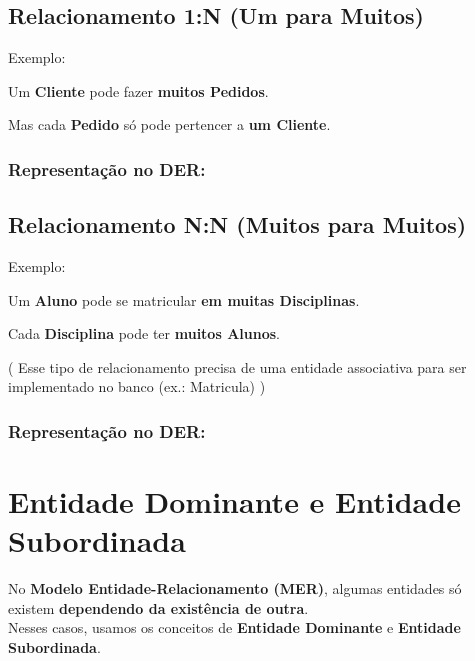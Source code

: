 \documentclass[
]{book}
\begin{document}


\subsection{\texorpdfstring{Relacionamento \textbf{1:N (Um para Muitos)}}{Relacionamento 1:N (Um para Muitos)}}\label{relacionamento-1n-um-para-muitos}

Exemplo:

Um \textbf{Cliente} pode fazer \textbf{muitos Pedidos}.

Mas cada \textbf{Pedido} só pode pertencer a \textbf{um Cliente}.

\subsubsection{Representação no DER:}\label{representauxe7uxe3o-no-der-1}



\subsection{Relacionamento N:N (Muitos para Muitos)}\label{relacionamento-nn-muitos-para-muitos}

Exemplo:

Um \textbf{Aluno} pode se matricular \textbf{em muitas Disciplinas}.

Cada \textbf{Disciplina} pode ter \textbf{muitos Alunos}.

( Esse tipo de relacionamento precisa de uma entidade associativa para ser implementado no banco (ex.: Matricula) )

\subsubsection{Representação no DER:}\label{representauxe7uxe3o-no-der-2}



\section{Entidade Dominante e Entidade Subordinada}\label{entidade-dominante-e-entidade-subordinada}

No \textbf{Modelo Entidade-Relacionamento (MER)}, algumas entidades só existem \textbf{dependendo da existência de outra}.\\
Nesses casos, usamos os conceitos de \textbf{Entidade Dominante} e \textbf{Entidade Subordinada}.
\end{document}
